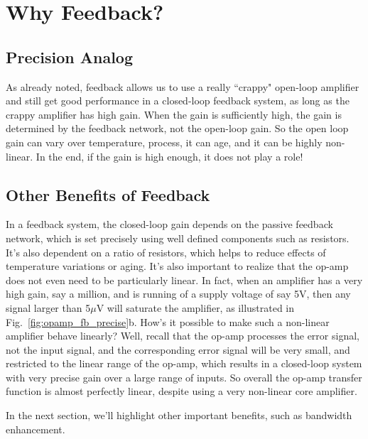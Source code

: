 \section{Why Feedback?}


\subsection{Precision Analog}


As already noted, feedback allows us to use a really ``crappy" open-loop amplifier and still get good performance in a closed-loop feedback system, as long as the crappy amplifier has high gain.  When the gain is sufficiently high, the gain is determined by the feedback network, not the open-loop gain.  So the open loop gain can vary over temperature, process, it can age, and it can be highly non-linear.  In the end, if the gain is high enough, it does not play a role!
 
 

\subsection{Other Benefits of Feedback}

In a feedback system, the closed-loop gain depends on the passive feedback network, which is set precisely using well defined components such as resistors.  It's also dependent on a ratio of resistors, which helps to reduce effects of temperature variations or aging.  It's also important to realize that the op-amp does not even need to be particularly linear.  In fact, when an amplifier has a very high gain, say a million, and is running of a supply voltage of say 5V, then any signal larger than 5$\mu$V will saturate the amplifier, as illustrated in Fig.~\ref{fig:opamp_fb_precise}b.  How's it possible to make such a non-linear amplifier behave linearly?  Well, recall that the op-amp processes the error signal, not the input signal, and the corresponding error signal will be very small, and restricted to the linear range of the op-amp, which results in a closed-loop system with very precise gain over a large range of inputs.  So overall the op-amp transfer function is almost perfectly linear, despite using a very non-linear core amplifier. 

In the next section, we'll highlight other important benefits, such as bandwidth enhancement.  

